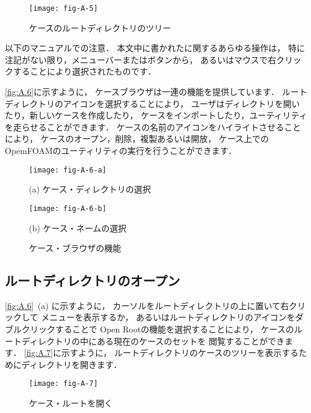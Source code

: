 \begin{figure}[ht]
 \texttt{[image: fig-A-5]}
 \caption{ケースのルートディレクトリのツリー}
 \label{fig:A.5}
\end{figure}


以下のマニュアルでの注意．
本文中に書かれたに関するあらゆる操作は，
特に注記がない限り，メニューバーまたはボタンから，
あるいはマウスで右クリックすることにより選択されたものです．

\autoref{fig:A.6}に示すように，
ケースブラウザは一連の機能を提供しています．
ルートディレクトリのアイコンを選択することにより，
ユーザはディレクトリを開いたり，新しいケースを作成したり，
ケースをインポートしたり，ユーティリティを走らせることができます．
ケースの名前のアイコンをハイライトさせることにより，
ケースのオープン，削除，複製あるいは開放，
ケース上でのOpemFOAMのユーティリティの実行を行うことができます．


\begin{figure}[ht]
 \begin{minipage}{.49\textwidth}
  \centering
  \texttt{[image: fig-A-6-a]}\par
  (a) ケース・ディレクトリの選択
 \end{minipage}
 \begin{minipage}{.49\textwidth}
  \centering
  \texttt{[image: fig-A-6-b]}\par
  (b) ケース・ネームの選択
 \end{minipage}
 \caption{ケース・ブラウザの機能}
 \label{fig:A.6}
\end{figure}


\subsection{ルートディレクトリのオープン}
\label{ssec:A.3.1}
\autoref{fig:A.6}~(a) に示すように，
カーソルをルートディレクトリの上に置いて右クリックして
メニューを表示するか，
あるいはルートディレクトリのアイコンをダブルクリックすることで
Open Rootの機能を選択することにより，
ケースのルートディレクトリの中にある現在のケースのセットを
閲覧することができます．
\autoref{fig:A.7}に示すように，
ルートディレクトリのケースのツリーを表示するためにディレクトリを開きます．


\begin{figure}[ht]
 \texttt{[image: fig-A-7]}
 \caption{ケース・ルートを開く}
 \label{fig:A.7}
\end{figure}


